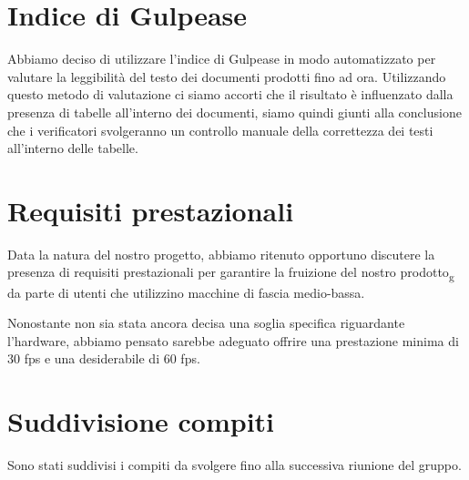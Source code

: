 \section{Indice di Gulpease}
Abbiamo deciso di utilizzare l'indice di Gulpease in modo automatizzato per valutare la leggibilità del testo dei documenti prodotti fino ad ora. \tabularnewline
Utilizzando questo metodo di valutazione ci siamo accorti che il risultato è influenzato dalla presenza di tabelle all'interno dei documenti, siamo quindi giunti alla conclusione che i verificatori svolgeranno un controllo manuale della correttezza dei testi all'interno delle tabelle.

\section{Requisiti prestazionali}
Data la natura del nostro progetto, abbiamo ritenuto opportuno discutere la presenza di requisiti prestazionali per garantire la fruizione del nostro prodotto\textsubscript{g} da parte di utenti che utilizzino macchine di fascia medio-bassa. \tabularnewline

Nonostante non sia stata ancora decisa una soglia specifica riguardante l'hardware, abbiamo pensato sarebbe adeguato offrire una prestazione minima di 30 fps e una desiderabile di 60 fps.

\section{Suddivisione compiti}
Sono stati suddivisi i compiti da svolgere fino alla successiva riunione del gruppo.
